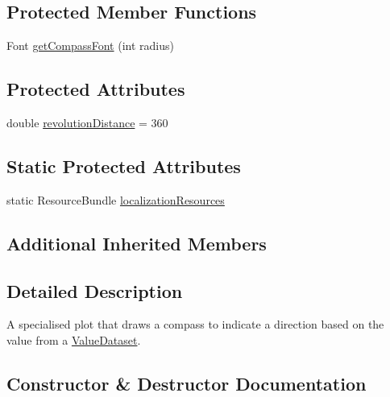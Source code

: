 \subsection*{Protected Member Functions}
\begin{DoxyCompactItemize}
\item 
Font \mbox{\hyperlink{classorg_1_1jfree_1_1chart_1_1plot_1_1_compass_plot_a773dee57b40e888c08bf134270b3ddfe}{get\+Compass\+Font}} (int radius)
\end{DoxyCompactItemize}
\subsection*{Protected Attributes}
\begin{DoxyCompactItemize}
\item 
double \mbox{\hyperlink{classorg_1_1jfree_1_1chart_1_1plot_1_1_compass_plot_a1c15731597dfa20e301cdf0cb275d173}{revolution\+Distance}} = 360
\end{DoxyCompactItemize}
\subsection*{Static Protected Attributes}
\begin{DoxyCompactItemize}
\item 
static Resource\+Bundle \mbox{\hyperlink{classorg_1_1jfree_1_1chart_1_1plot_1_1_compass_plot_a7147a5e78e33c472fc4bc3a2d4e2418b}{localization\+Resources}}
\end{DoxyCompactItemize}
\subsection*{Additional Inherited Members}


\subsection{Detailed Description}
A specialised plot that draws a compass to indicate a direction based on the value from a \mbox{\hyperlink{}{Value\+Dataset}}. 

\subsection{Constructor \& Destructor Documentation}
\mbox{\label{classorg_1_1jfree_1_1chart_1_1plot_1_1_compass_plot_a5aafde9f4d437b3ccc77ed0c6f916c97}} 
